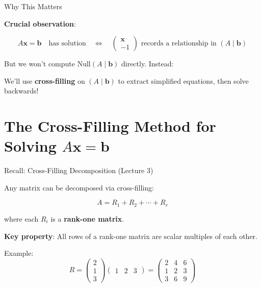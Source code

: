 \documentclass[10pt]{beamer}
\theoremstyle{definition}
\newcommand{\x}[1]{\alert{\textbf{#1}}}
\begin{document}
\begin{frame}{Why This Matters}

\x{Crucial observation}:

$$A\mathbf{x} = \mathbf{b} \quad\text{has solution}\quad \iff \quad \begin{pmatrix} \mathbf{x} \\ -1 \end{pmatrix} \text{ records a relationship in } (A \mid \mathbf{b})$$

\vspace{1em}

But we won't compute $\text{Null}(A \mid \mathbf{b})$ directly. Instead:

\vspace{0.5em}

We'll use \x{cross-filling} on $(A \mid \mathbf{b})$ to extract simplified equations, then solve backwards!

\end{frame}

\section{The Cross-Filling Method for Solving $A\mathbf{x} = \mathbf{b}$}

\begin{frame}{Recall: Cross-Filling Decomposition (Lecture 3)}

Any matrix can be decomposed via cross-filling:

$$A = R_1 + R_2 + \cdots + R_r$$

where each $R_i$ is a \x{rank-one matrix}.

\vspace{1em}

\x{Key property}: All rows of a rank-one matrix are scalar multiples of each other.

\vspace{1em}

Example:
$$R = \begin{pmatrix} 2 \\ 1 \\ 3 \end{pmatrix} \begin{pmatrix} 1 & 2 & 3 \end{pmatrix} = \begin{pmatrix}
2 & 4 & 6 \\
1 & 2 & 3 \\
3 & 6 & 9
\end{pmatrix}$$

\end{frame}
\end{document}

